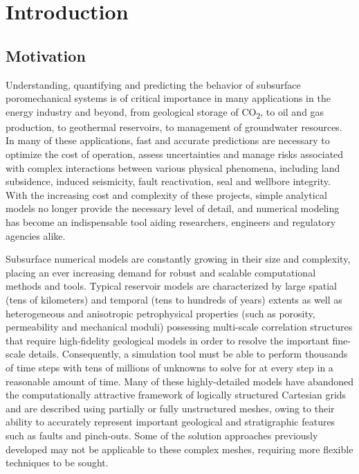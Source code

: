 \chapter{Introduction}
\label{ch:introduction}

\section{Motivation}
\label{sec:intro_motivation}

Understanding, quantifying and predicting the behavior of subsurface poromechanical systems is of critical importance in many applications in the energy industry and beyond, from geological storage of CO\textsubscript{2}, to oil and gas production, to geothermal reservoirs, to management of groundwater resources.   In many of these applications, fast and accurate predictions are necessary to optimize the cost of operation, assess uncertainties and manage risks associated with complex interactions between various physical phenomena, including land subsidence, induced seismicity, fault reactivation, seal and wellbore integrity.   With the increasing cost and complexity of these projects, simple analytical models no longer provide the necessary level of detail, and numerical modeling has become an indispensable tool aiding researchers, engineers and regulatory agencies alike.

Subsurface numerical models are constantly growing in their size and complexity, placing an ever increasing demand for robust and scalable computational methods and tools.   Typical reservoir models are characterized by large spatial (tens of kilometers) and temporal (tens to hundreds of years) extents as well as heterogeneous and anisotropic petrophysical properties (such as porosity, permeability and mechanical moduli) possessing multi-scale correlation structures that require high-fidelity geological models in order to resolve the important fine-scale details.   Consequently, a simulation tool must be able to perform thousands of time steps with tens of millions of unknowns to solve for at every step in a reasonable amount of time.   Many of these highly-detailed models have abandoned the computationally attractive framework of logically structured Cartesian grids and are described using partially or fully unstructured meshes, owing to their ability to accurately represent important geological and stratigraphic features such as faults and pinch-outs.   Some of the solution approaches previously developed may not be applicable to these complex meshes, requiring more flexible techniques to be sought.

